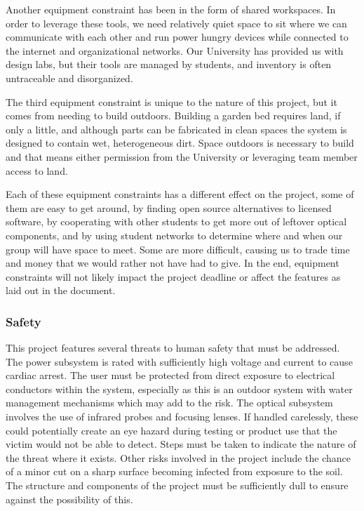Another equipment constraint has been in the form of shared workspaces. In order to leverage these tools, we need relatively quiet space to sit where we can communicate with each other and run power hungry devices while connected to the internet and organizational networks. Our University has provided us with design labs, but their tools are managed by students, and inventory is often untraceable and disorganized. 

The third equipment constraint is unique to the nature of this project, but it comes from needing to build outdoors. Building a garden bed requires land, if only a little, and although parts can be fabricated in clean spaces the system is designed to contain wet, heterogeneous dirt. Space outdoors is necessary to build and that means either permission from the University or leveraging team member access to land. 

Each of these equipment constraints has a different effect on the project, some of them are easy to get around, by finding open source alternatives to licensed software, by cooperating with other students to get more out of leftover optical components, and by using student networks to determine where and when our group will have space to meet. Some are more difficult, causing us to trade time and money that we would rather not have had to give. In the end, equipment constraints will not likely impact the project deadline or affect the features as laid out in the document.

\subsubsection{Safety}
This project features several threats to human safety that must be addressed. The power subsystem is rated with sufficiently high voltage and current to cause cardiac arrest. The user must be protected from direct exposure to electrical conductors within the system, especially as this is an outdoor system with water management mechanisms which may add to the risk. The optical subsystem involves the use of infrared probes and focusing lenses. If handled carelessly, these could potentially create an eye hazard during testing or product use that the victim would not be able to detect. Steps must be taken to indicate the nature of the threat where it exists. Other risks involved in the project include the chance of a minor cut on a sharp surface becoming infected from exposure to the soil. The structure and components of the project must be sufficiently dull to ensure against the possibility of this. \\

